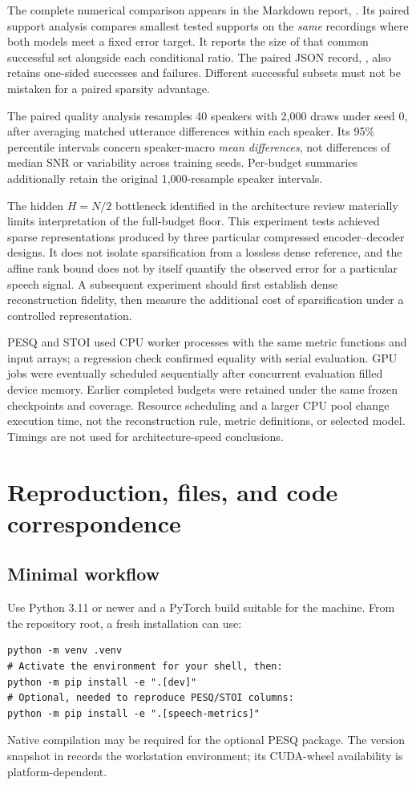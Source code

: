 \documentclass[11pt,a4paper]{article}
\newcommand{\code}[1]{\texttt{\small\detokenize{#1}}}
\begin{document}
The complete numerical comparison appears in the Markdown report, . Its paired support analysis compares smallest tested supports on the \emph{same} recordings where both models meet a fixed error target. It reports the size of that common successful set alongside each conditional ratio. The paired JSON record, , also retains one-sided successes and failures. Different successful subsets must not be mistaken for a paired sparsity advantage.

The paired quality analysis resamples 40 speakers with 2,000 draws under seed 0, after averaging matched utterance differences within each speaker. Its 95\% percentile intervals concern speaker-macro \emph{mean differences}, not differences of median SNR or variability across training seeds. Per-budget summaries additionally retain the original 1,000-resample speaker intervals.

The hidden $H=N/2$ bottleneck identified in the architecture review materially limits interpretation of the full-budget floor. This experiment tests achieved sparse representations produced by three particular compressed encoder--decoder designs. It does not isolate sparsification from a lossless dense reference, and the affine rank bound does not by itself quantify the observed error for a particular speech signal. A subsequent experiment should first establish dense reconstruction fidelity, then measure the additional cost of sparsification under a controlled representation.

PESQ and STOI used CPU worker processes with the same metric functions and input arrays; a regression check confirmed equality with serial evaluation. GPU jobs were eventually scheduled sequentially after concurrent evaluation filled device memory. Earlier completed budgets were retained under the same frozen checkpoints and coverage. Resource scheduling and a larger CPU pool change execution time, not the reconstruction rule, metric definitions, or selected model. Timings are not used for architecture-speed conclusions.

\section{Reproduction, files, and code correspondence}
\subsection{Minimal workflow}
Use Python 3.11 or newer and a PyTorch build suitable for the machine. From the repository root, a fresh installation can use:
\begin{lstlisting}
python -m venv .venv
# Activate the environment for your shell, then:
python -m pip install -e ".[dev]"
# Optional, needed to reproduce PESQ/STOI columns:
python -m pip install -e ".[speech-metrics]"
\end{lstlisting}
Native compilation may be required for the optional PESQ package. The version snapshot in \code{requirements-lock.txt} records the workstation environment; its CUDA-wheel availability is platform-dependent.
\end{document}
